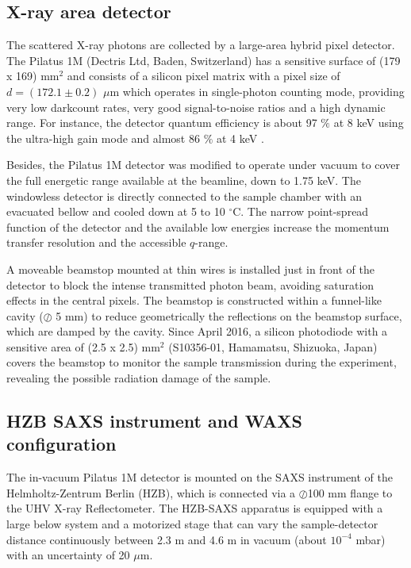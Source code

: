 \subsection{X-ray area detector}
\label{sec:pilatus}

The scattered X-ray photons are collected by a large-area hybrid pixel detector. The Pilatus 1M (Dectris Ltd, Baden, Switzerland) has a sensitive surface of (179 x 169) mm$^2$ and consists of a silicon pixel matrix with a pixel size of $d = (172.1 \pm 0.2)$ $\mu$m which operates in single-photon counting mode, providing very low darkcount rates, very good signal-to-noise ratios and a high dynamic range. For instance, the detector quantum efficiency is about 97 $\%$ at 8 keV using the ultra-high gain mode and almost 86 $\%$ at 4 keV \citep{wernecke_characterization_2014}.

Besides, the Pilatus 1M detector was modified to operate under vacuum to cover the full energetic range available at the beamline, down to 1.75 keV. The windowless detector is directly connected to the sample chamber with an evacuated bellow and cooled down at 5 to 10 $^{\circ}$C. The narrow point-spread function of the detector and the available low energies increase the momentum transfer resolution and the accessible $q$-range.

A moveable beamstop mounted at thin wires is installed just in front of the detector to block the intense transmitted photon beam, avoiding saturation effects in the central pixels. The beamstop is constructed within a funnel-like cavity ($\oslash$ 5 mm) to reduce geometrically the reflections on the beamstop surface, which are damped by the cavity. Since April 2016, a silicon photodiode with a sensitive area of (2.5 x 2.5) mm$^2$ (S10356-01, Hamamatsu, Shizuoka, Japan) covers the beamstop to monitor the sample transmission during the experiment, revealing the possible radiation damage of the sample.

\subsection{HZB SAXS instrument and WAXS configuration}
\label{sec:WAXS_experimental}

The in-vacuum Pilatus 1M detector is mounted on the SAXS instrument of the Helmholtz-Zentrum Berlin (HZB), which is connected via a $\oslash$100 mm flange to the UHV X-ray Reflectometer. The HZB-SAXS apparatus is equipped with a large below system and a motorized stage that can vary the sample-detector distance continuously between 2.3 m and 4.6 m in vacuum (about $10^{-4}$ mbar) with an uncertainty of 20 $\mu$m. 

